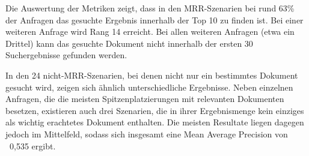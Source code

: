 Die Auswertung der Metriken zeigt, dass in den MRR-Szenarien bei rund 63\% der Anfragen das gesuchte Ergebnis innerhalb der Top 10 zu finden ist. Bei einer weiteren Anfrage wird Rang 14 erreicht. Bei allen weiteren Anfragen (etwa ein Drittel) kann das gesuchte Dokument nicht innerhalb der ersten 30 Suchergebnisse gefunden werden.
 
In den 24 nicht-MRR-Szenarien, bei denen nicht nur ein bestimmtes Dokument gesucht wird, zeigen sich ähnlich unterschiedliche Ergebnisse. Neben einzelnen Anfragen, die die meisten Spitzenplatzierungen mit relevanten Dokumenten besetzen, existieren auch drei Szenarien, die in ihrer Ergebnismenge kein einziges als wichtig erachtetes Dokument enthalten. Die meisten Resultate liegen dagegen jedoch im Mittelfeld, sodass sich insgesamt eine Mean Average Precision von ~0,535 ergibt.

